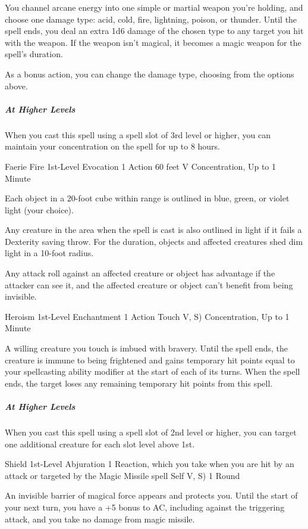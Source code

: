 \documentclass[letterpaper,openany,oneside,twocolumn]{book}
\begin{document}
You channel arcane energy into one simple or martial weapon you're holding, and choose one damage type: acid, cold, fire, lightning, poison, or thunder. Until the spell ends, you deal an extra 1d6 damage of the chosen type to any target you hit with the weapon. If the weapon isn't magical, it becomes a magic weapon for the spell's duration.

As a bonus action, you can change the damage type, choosing from the options above.

\subparagraph*{At Higher Levels} When you cast this spell using a spell slot of 3rd level or higher, you can maintain your concentration on the spell for up to 8 hours.

\DndSpellHeader
  {Faerie Fire}
  {1st-Level Evocation}
  {1 Action}
  {60 feet}
  {V}
  {Concentration, Up to 1 Minute}

Each object in a 20-foot cube within range is outlined in blue, green, or violet light (your choice).

Any creature in the area when the spell is cast is also outlined in light if it fails a Dexterity saving throw. For the duration, objects and affected creatures shed dim light in a 10-foot radius.

Any attack roll against an affected creature or object has advantage if the attacker can see it, and the affected creature or object can't benefit from being invisible.

\DndSpellHeader
  {Heroism}
  {1st-Level Enchantment}
  {1 Action}
  {Touch}
  {V, S)}
  {Concentration, Up to 1 Minute}

A willing creature you touch is imbued with bravery. Until the spell ends, the creature is immune to being frightened and gains temporary hit points equal to your spellcasting ability modifier at the start of each of its turns. When the spell ends, the target loses any remaining temporary hit points from this spell.

\subparagraph*{At Higher Levels} When you cast this spell using a spell slot of 2nd level or higher, you can target one additional creature for each slot level above 1st.

\DndSpellHeader
  {Shield}
  {1st-Level Abjuration}
  {1 Reaction, which you take when you are hit by an attack or targeted by the Magic Missile spell}
  {Self}
  {V, S)}
  {1 Round}

An invisible barrier of magical force appears and protects you. Until the start of your next turn, you have a +5 bonus to AC, including against the triggering attack, and you take no damage from magic missile.
\end{document}
